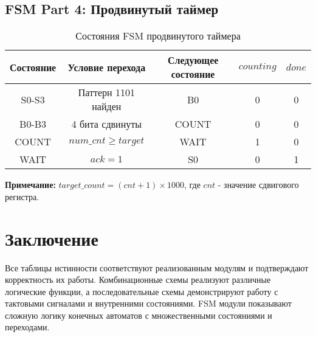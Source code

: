 \documentclass[12pt,a4paper]{article}
\begin{document}
\subsection{FSM Part 4: Продвинутый таймер}

\begin{table}[h]
\centering
\caption{Состояния FSM продвинутого таймера}
\begin{tabular}{|c|c|c|c|c|}
\hline
Состояние & Условие перехода & Следующее состояние & $counting$ & $done$ \\
\hline
S0-S3 & Паттерн 1101 найден & B0 & 0 & 0 \\
B0-B3 & 4 бита сдвинуты & COUNT & 0 & 0 \\
COUNT & $num\_cnt \geq target$ & WAIT & 1 & 0 \\
WAIT & $ack = 1$ & S0 & 0 & 1 \\
\hline
\end{tabular}
\end{table}

\textbf{Примечание:} $target\_count = (cnt + 1) \times 1000$, где $cnt$ - значение сдвигового регистра.

\section{Заключение}

Все таблицы истинности соответствуют реализованным модулям и подтверждают корректность их работы. Комбинационные схемы реализуют различные логические функции, а последовательные схемы демонстрируют работу с тактовыми сигналами и внутренними состояниями. FSM модули показывают сложную логику конечных автоматов с множественными состояниями и переходами.
\end{document}
